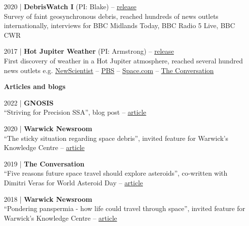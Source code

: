 \documentclass[10pt,a4paper]{altacv}
\begin{document}
\smallskip

\small 2020 | \textbf{DebrisWatch I} (PI: Blake) -- \href{https://warwick.ac.uk/newsandevents/pressreleases/faint_orbital_debris/}{release} \\
Survey of faint geosynchronous debris, reached hundreds of news outlets internationally, interviews for BBC Midlands Today, BBC Radio 5 Live, BBC CWR 

\smallskip

\small 2017 | \textbf{Hot Jupiter Weather} (PI: Armstrong) -- \href{https://warwick.ac.uk/newsandevents/pressreleases/winds_of_rubies/}{release} \\
First discovery of weather in a Hot Jupiter atmosphere, reached several hundred news outlets e.g. \href{https://www.newscientist.com/article/2115792-first-exoplanet-weather-report-shows-clouds-of-ruby-and-sapphire/}{NewScientist} -- \href{https://www.pbs.org/newshour/science/heres-first-weather-report-exoplanet}{PBS} -- \href{https://www.space.com/34992-giant-alien-planet-ruby-clouds-weather.html}{Space.com} --
\href{https://theconversation.com/how-we-caught-the-first-glimpse-of-weather-on-a-faraway-gas-giant-70229}{The Conversation}

\divider

\normalsize \textbf{Articles and blogs}

\medskip

\small 2022 | \textbf{GNOSIS} \\
``Striving for Precision SSA'', blog post -- \href{https://gnosisnetwork.org/blog/striving-for-precision-ssa/}{article}

\smallskip

\small 2020 | \textbf{Warwick Newsroom} \\
``The sticky situation regarding space debris'', invited feature for Warwick's Knowledge Centre -- \href{https://warwick.ac.uk/newsandevents/knowledgecentre/science/physics-astrophysics/space_debris}{article}

\smallskip

\small 2019 | \textbf{The Conversation} \\
``Five reasons future space travel should explore asteroids'', co-written with Dimitri Veras for World Asteroid Day -- \href{https://theconversation.com/five-reasons-future-space-travel-should-explore-asteroids-119246}{article}

\smallskip

\small 2018 | \textbf{Warwick Newsroom} \\
``Pondering panspermia - how life could travel through space'', invited feature for Warwick's Knowledge Centre -- \href{https://warwick.ac.uk/newsandevents/knowledgecentre/science/physics-astrophysics/panspermia}{article}
\end{document}
